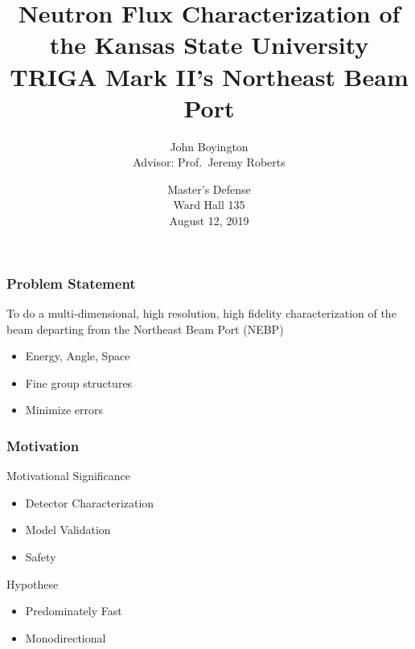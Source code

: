 \documentclass[fleqn]{beamer}
\title[KSU Beam Characterization]{Neutron Flux Characterization of the Kansas State University TRIGA Mark II's Northeast Beam Port}
\author[John Boyington]{
    John Boyington\\
    Advisor: Prof.~Jeremy Roberts}
\institute[Kansas State University]{
    Department of Mechanical and Nuclear Engineering \\
    Kansas State University}
\date[Master's Defense]{
    Master's Defense\\
    Ward Hall 135\\
    August 12, 2019}
\begin{document}
\newcommand{\beginbackup}{
    \newcounter{framenumbervorappendix}
    \setcounter{framenumbervorappendix}{\value{framenumber}}
}
\newcommand{\backupend}{
    \addtocounter{framenumbervorappendix}{-\value{framenumber}}
    \addtocounter{framenumber}{\value{framenumbervorappendix}}
}



\begin{frame}
\titlepage
\end{frame}

\begin{frame}
\frametitle{Problem Statement}

To do a multi-dimensional, high resolution, high fidelity characterization of the beam departing from the Northeast Beam Port (NEBP)
\begin{itemize}
\item Energy, Angle, Space
\item Fine group structures
\item Minimize errors
\end{itemize}

\end{frame}

\begin{frame}
\frametitle{Motivation}

\begin{block}{Motivational Significance}
\begin{itemize}
\item Detector Characterization
\item Model Validation
\item Safety
\end{itemize}
\end{block}

\begin{block}{Hypothese}
\begin{itemize}
\item Predominately Fast
\item Monodirectional
\end{itemize}
\end{block}

\end{frame}
\end{document}

